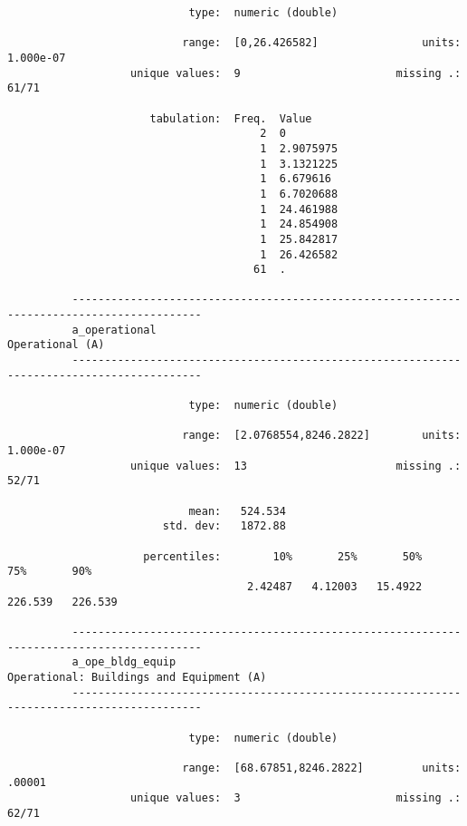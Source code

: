 \documentclass{article}
\begin{document}
\begin{verbatim}
                            type:  numeric (double)
          
                           range:  [0,26.426582]                units:  1.000e-07
                   unique values:  9                        missing .:  61/71
          
                      tabulation:  Freq.  Value
                                       2  0
                                       1  2.9075975
                                       1  3.1321225
                                       1  6.679616
                                       1  6.7020688
                                       1  24.461988
                                       1  24.854908
                                       1  25.842817
                                       1  26.426582
                                      61  .
          
          ------------------------------------------------------------------------------------------
          a_operational                                                              Operational (A)
          ------------------------------------------------------------------------------------------
          
                            type:  numeric (double)
          
                           range:  [2.0768554,8246.2822]        units:  1.000e-07
                   unique values:  13                       missing .:  52/71
          
                            mean:   524.534
                        std. dev:   1872.88
          
                     percentiles:        10%       25%       50%       75%       90%
                                     2.42487   4.12003   15.4922   226.539   226.539
          
          ------------------------------------------------------------------------------------------
          a_ope_bldg_equip                                  Operational: Buildings and Equipment (A)
          ------------------------------------------------------------------------------------------
          
                            type:  numeric (double)
          
                           range:  [68.67851,8246.2822]         units:  .00001
                   unique values:  3                        missing .:  62/71
          

\end{verbatim}
\end{document}
